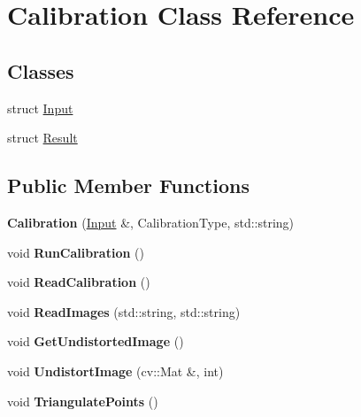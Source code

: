 \hypertarget{class_calibration}{}\section{Calibration Class Reference}
\label{class_calibration}
\subsection*{Classes}
\begin{DoxyCompactItemize}
\item 
struct \mbox{\hyperlink{struct_calibration_1_1_input}{Input}}
\item 
struct \mbox{\hyperlink{struct_calibration_1_1_result}{Result}}
\end{DoxyCompactItemize}
\subsection*{Public Member Functions}
\begin{DoxyCompactItemize}
\item 
\mbox{\label{class_calibration_a2cf135c9af559c572c0ef936d4f3a855}} 
{\bfseries Calibration} (\mbox{\hyperlink{struct_calibration_1_1_input}{Input}} \&, Calibration\+Type, std\+::string)
\item 
\mbox{\label{class_calibration_aeaf69ff615f3d3d06a81d75c9e5fd6b8}} 
void {\bfseries Run\+Calibration} ()
\item 
\mbox{\label{class_calibration_ad675a1c74ecd23e3af37fcffdeeed246}} 
void {\bfseries Read\+Calibration} ()
\item 
\mbox{\label{class_calibration_adbf0f8faf4044bcab517f0312185b740}} 
void {\bfseries Read\+Images} (std\+::string, std\+::string)
\item 
\mbox{\label{class_calibration_ad14d55fa0bdce86f57e7bbc74c8f3135}} 
void {\bfseries Get\+Undistorted\+Image} ()
\item 
\mbox{\label{class_calibration_a3be7f07fb9f82f7b104f43afabe9aec7}} 
void {\bfseries Undistort\+Image} (cv\+::\+Mat \&, int)
\item 
\mbox{\label{class_calibration_ac45057de8e66aed9720410a8a3c569bf}} 
void {\bfseries Triangulate\+Points} ()
\end{DoxyCompactItemize}
